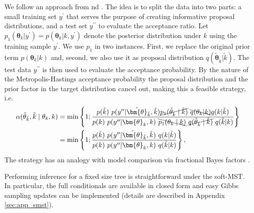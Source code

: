 We follow an approach from \cite{lee2015bayesian} nd \cite{xu2016bayesian}.
The idea is to split the data into two parts: a small
training set $y^\prime$ that serves the purpose of creating
informative proposal distributions, and a test set $y^{\prime \prime}$
to evaluate the acceptance ratio.  Let $p_1(\bm{\theta}_k | y^\prime)
= p(\bm{\theta}_k | k, y^\prime)$ denote the posterior distribution
under $k$ using the training sample $y^\prime$.  We use $p_1$ in two
instances.  First, we replace the original prior term $p(\bm{\theta}_k
| k)$ and, second, we also use it as proposal distribution
$q(\tilde{\bm{\theta}}_{\tilde{k}} | \tilde{k})$.  The test data
$y^{\prime \prime}$ is then used to evaluate the acceptance
probability.  By the nature of the Metropolis-Hastings acceptance
probability the proposal distribution and the prior factor in the
target distribution cancel out, making this a feasible strategy, i.e.
\begin{align}
\alpha(\tilde{\theta}_{\tilde{k}}, \tilde{k}\mid \theta_k, k) &= \min \left\{ 1; \frac{p(\tilde{k}) \ p (y^{\prime \prime} | \tilde{\bm{\theta}}_{\tilde{k}}, \tilde{k}) \cancel{p_1(\tilde{\theta}_{\tilde{k}} \mid \tilde{k})}\ \bcancel{q(\theta_k | k)} q(k | \tilde{k}) }{p(k) \ p (y^{\prime \prime} | \bm{\theta}_k, k) \ \bcancel{p_1(\theta_k \mid k)} \ \cancel{q(\tilde{\theta}_{\tilde{k}} \mid \tilde{k})} \ q(\tilde{k} | k)} \right\} \nonumber \\
&=\min \left\{ 1; \frac{p(\tilde{k}) \ p (y^{\prime \prime} | \tilde{\bm{\theta}}_{\tilde{k}}, \tilde{k})\ q(k | \tilde{k})}{p(k) \ p (y^{\prime \prime} | \bm{\theta}_k, k) \ q(\tilde{k} | k)} \right\},
\label{eq:alpha}
\end{align}
The strategy has an analogy with model comparison via fractional Bayes factors \citep{o1995fractional}.



Performing inference for a fixed size tree is straightforward under the soft-MST.
In particular, the full conditionals are available in closed form and easy Gibbs sampling updates can be implemented (details are described in Appendix \ref{sec:app_smst}).


